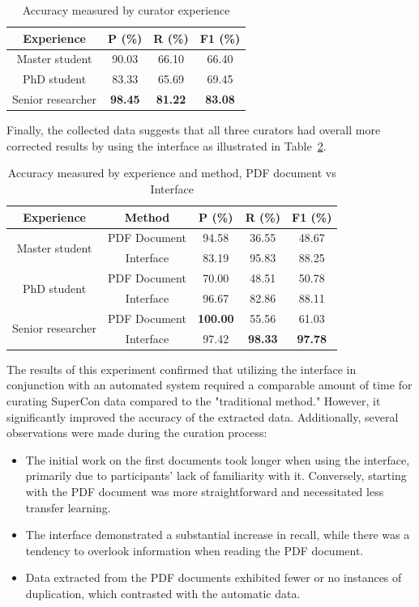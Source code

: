 \documentclass[a4paper]{article}
\begin{document}
\begin{table}[h]
\centering
\begin{tabular}{c|ccc}
\textbf{Experience} & \textbf{P (\%)} & \textbf{R (\%)} & \textbf{F1 (\%)} \\
\hline
Master student & 90.03 & 66.10 & 66.40 \\
PhD student & 83.33 & 65.69 & 69.45 \\
Senior researcher & \textbf{98.45} & \textbf{81.22} & \textbf{83.08} \\
\end{tabular}
\caption{Accuracy measured by curator experience}
\label{tab:accuracy-by-experience}
\end{table}

Finally, the collected data suggests that all three curators had overall more corrected results by using the interface as illustrated in Table~\ref{tab:accuracy-by-experience-method}. 

\begin{table}[h]
\centering
\begin{tabular}{c|cccc}
\textbf{Experience} & \textbf{Method} & \textbf{P (\%)} & \textbf{R (\%)} & 
\textbf{F1 (\%)} \\
\hline
\multirow{2}{*}{Master student} & PDF Document & 94.58 & 36.55 & 48.67 \\
 & Interface & 83.19 & 95.83 & 88.25 \\
\hline
\multirow{2}{*}{PhD student} & PDF Document & 70.00 & 48.51 & 50.78 \\
 & Interface & 96.67 & 82.86 & 88.11 \\
\hline
\multirow{2}{*}{Senior researcher} & PDF Document & \textbf{100.00} & 55.56 & 61.03 \\
 & Interface & 97.42 & \textbf{98.33} & \textbf{97.78} \\
\end{tabular}
\caption{Accuracy measured by experience and method, PDF document vs Interface}
\label{tab:accuracy-by-experience-method}
\end{table}


The results of this experiment confirmed that utilizing the interface in conjunction with an automated system required a comparable amount of time for curating SuperCon data compared to the "traditional method." However, it significantly improved the accuracy of the extracted data.
Additionally, several observations were made during the curation process:

\begin{itemize}
    \item The initial work on the first documents took longer when using the interface, primarily due to participants' lack of familiarity with it. Conversely, starting with the PDF document was more straightforward and necessitated less transfer learning.
    \item The interface demonstrated a substantial increase in recall, while there was a tendency to overlook information when reading the PDF document.
    \item Data extracted from the PDF documents exhibited fewer or no instances of duplication, which contrasted with the automatic data.    
\end{itemize}
\end{document}
